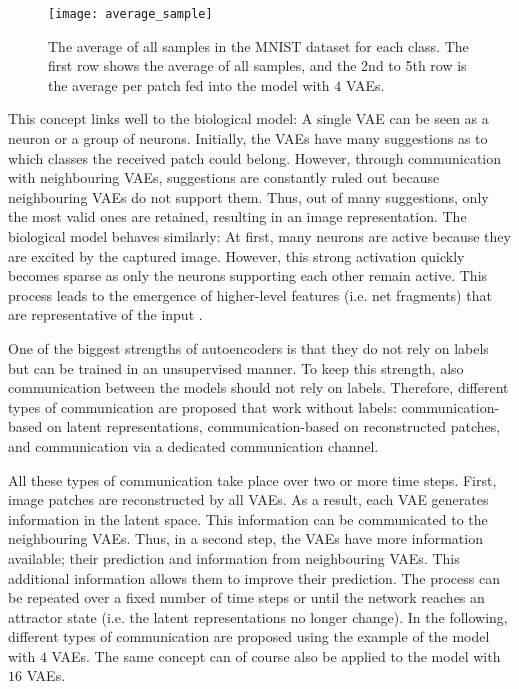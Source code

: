 \begin{figure}[h]
    \centering
    \texttt{[image: average\_sample]}
    \caption[Average sample of the MNIST dataset per class]{The average of all samples in the MNIST dataset for each class. The first row shows the average of all samples, and the 2nd to 5th row is the average per patch fed into the model with $4$ VAEs.}
\end{figure}


This concept links well to the biological model: A single VAE can be seen as a neuron or a group of neurons. Initially, the VAEs have many suggestions as to which classes the received patch could belong. However, through communication with neighbouring VAEs, suggestions are constantly ruled out because neighbouring VAEs do not support them. Thus, out of many suggestions, only the most valid ones are retained, resulting in an image representation. The biological model behaves similarly: At first, many neurons are active because they are excited by the captured image. However, this strong activation quickly becomes sparse as only the neurons supporting each other remain active. This process leads to the emergence of higher-level features (i.e. net fragments) that are representative of the input .

One of the biggest strengths of autoencoders is that they do not rely on labels but can be trained in an unsupervised manner. To keep this strength, also communication between the models should not rely on labels. Therefore, different types of communication are proposed that work without labels: communication-based on latent representations, communication-based on reconstructed patches, and communication via a dedicated communication channel.

All these types of communication take place over two or more time steps. First, image patches are reconstructed by all VAEs. As a result, each VAE generates information in the latent space. This information can be communicated to the neighbouring VAEs. Thus, in a second step, the VAEs have more information available; their prediction and information from neighbouring VAEs. This additional information allows them to improve their prediction. The process can be repeated over a fixed number of time steps or until the network reaches an attractor state (i.e. the latent representations no longer change). In the following, different types of communication are proposed using the example of the model with $4$ VAEs. The same concept can of course also be applied to the model with $16$ VAEs.


